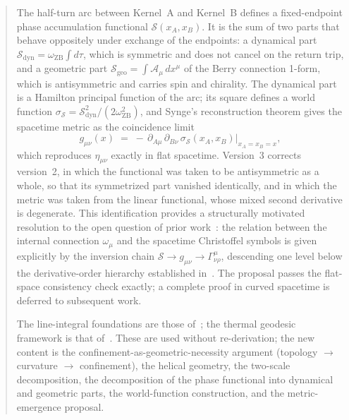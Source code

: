 \documentclass[%
 reprint, amsmath,amssymb, aps, prb, ]{revtex4-2}
\numberwithin{equation}{section}
\newcommand{\omZB}{\omega_{\text{ZB}}}
\begin{document}
\begin{abstract}
The half-turn arc between Kernel~A and Kernel~B defines a fixed-endpoint phase accumulation functional $\mathcal{S}(x_A,x_B)$.
It is the sum of two parts that behave oppositely under exchange of the endpoints: a dynamical part $\mathcal{S}_{\mathrm{dyn}} = \omZB\int d\tau$, which is symmetric and does not cancel on the return trip, and a geometric part $\mathcal{S}_{\mathrm{geo}} = \int\mathcal{A}_\mu\,dx^\mu$ of the Berry connection 1-form, which is antisymmetric and carries spin and chirality.
The dynamical part is a Hamilton principal function of the arc; its square defines a world function $\sigma_{\mathcal{S}} = \mathcal{S}_{\mathrm{dyn}}^2/(2\omZB^2)$, and Synge's reconstruction theorem gives the spacetime metric as the coincidence limit
\begin{equation*}
g_{\mu\nu}(x) \;=\; -\,\partial_{A\mu}\,\partial_{B\nu}\,\sigma_{\mathcal{S}}(x_A,x_B)\big|_{x_A=x_B=x},
\end{equation*}
which reproduces $\eta_{\mu\nu}$ exactly in flat spacetime.
Version~3 corrects version~2, in which the functional was taken to be antisymmetric as a whole, so that its symmetrized part vanished identically, and in which the metric was taken from the linear functional, whose mixed second derivative is degenerate.
This identification provides a structurally motivated resolution to the open question of prior work~\cite{hanamura37, hanamura40}: the relation between the internal connection $\omega_\mu$ and the spacetime Christoffel symbols is given explicitly by the inversion chain $\mathcal{S} \to g_{\mu\nu} \to \Gamma^\mu_{\nu\rho}$, descending one level below the derivative-order hierarchy established in~\cite{hanamura40}.
The proposal passes the flat-space consistency check exactly; a complete proof in curved spacetime is deferred to subsequent work.

The line-integral foundations are those of~\cite{hanamura29, hanamura30, hanamura31}; the thermal geodesic framework is that of~\cite{hanamura24}.
These are used without re-derivation; the new content is the confinement-as-geometric-necessity argument (topology $\to$ curvature $\to$ confinement), the helical geometry, the two-scale decomposition, the decomposition of the phase functional into dynamical and geometric parts, the world-function construction, and the metric-emergence proposal.
\end{abstract}

\maketitle
\end{document}
